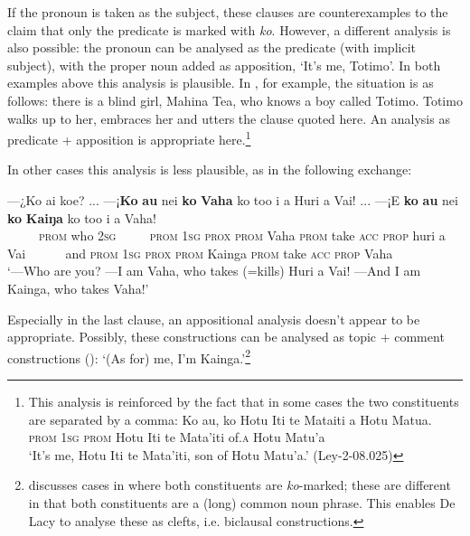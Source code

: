 If the pronoun is taken as the subject, these clauses are counterexamples to the claim that only the predicate is marked with \textit{ko}. However, a different analysis is also possible: the pronoun can be analysed as the predicate (with implicit subject), with the proper noun added as apposition, ‘It’s me, Totimo’. In both examples above this analysis is plausible. In , for example, the situation is as follows: there is a blind girl, Mahina Tea, who knows a boy called Totimo. Totimo walks up to her, embraces her and utters the clause quoted here. An analysis as predicate + apposition is appropriate here.\footnote{\label{fn:463}This analysis is reinforced by the fact that in some cases the two constituents are separated by a comma:
\ea \gll 
Ko au, ko Hotu {\ꞌ}Iti te Mata{\ꞌ}iti {\ꞌ}a Hotu Matu{\ꞌ}a.\\
  \textsc{prom} \textsc{1sg} \textsc{prom} Hotu Iti te Mata’iti of\textsc{.a} Hotu Matu’a\\
  \glt 
  ‘It’s me, Hotu Iti te Mata’iti, son of Hotu Matu’a.’ (Ley-2-08.025)\z } 

In other cases this analysis is less plausible, as in the following exchange:

\ea\label{ex:9.19}
\gll —¿Ko ai koe? ... —¡\textbf{Ko} \textbf{au} nei \textbf{ko} \textbf{Vaha} ko to{\ꞌ}o i a Huri {\ꞌ}a Vai! ... —¡{\ꞌ}E \textbf{ko} \textbf{au} nei \textbf{ko} \textbf{Kaiŋa} ko to{\ꞌ}o i a Vaha! \\
~~~~~\textsc{prom} who \textsc{2sg}  ~ ~~~\textsc{prom} \textsc{1sg} \textsc{prox} \textsc{prom} Vaha \textsc{prom} take \textsc{acc} \textsc{prop} huri a Vai  ~ ~~~~and \textsc{prom} \textsc{1sg} \textsc{prox} \textsc{prom} Kainga \textsc{prom} take \textsc{acc} \textsc{prop} Vaha \\

\glt
‘—Who are you? —I am Vaha, who takes (=kills) Huri a Vai! —And I am Kainga, who takes Vaha!’ \textstyleExampleref{[R304.97-101]}
\z

Especially in the last clause, an appositional analysis doesn’t appear to be appropriate. Possibly, these constructions can be analysed as topic + comment constructions (): ‘(As for) me, I’m Kainga.’\footnote{\label{fn:464}\citet[47]{DeLacy1999} discusses cases in  where both constituents are \textit{ko}-marked; these are different in that both constituents are a (long) common noun phrase. This enables De Lacy to analyse these as clefts, i.e. biclausal constructions.} 

